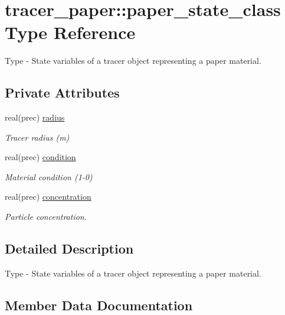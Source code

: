 \hypertarget{structtracer__paper_1_1paper__state__class}{}\section{tracer\+\_\+paper\+:\+:paper\+\_\+state\+\_\+class Type Reference}
\label{structtracer__paper_1_1paper__state__class}


Type -\/ State variables of a tracer object representing a paper material.  


\subsection*{Private Attributes}
\begin{DoxyCompactItemize}
\item 
real(prec) \mbox{\hyperlink{structtracer__paper_1_1paper__state__class_a931d90e457142607c7e1079b99f72298}{radius}}
\begin{DoxyCompactList}\small\item\em Tracer radius (m) \end{DoxyCompactList}\item 
real(prec) \mbox{\hyperlink{structtracer__paper_1_1paper__state__class_a1e2ac1d6419a5ec39dd8529f8cd83112}{condition}}
\begin{DoxyCompactList}\small\item\em Material condition (1-\/0) \end{DoxyCompactList}\item 
real(prec) \mbox{\hyperlink{structtracer__paper_1_1paper__state__class_aa470bc7607345df98b01f08b2450640e}{concentration}}
\begin{DoxyCompactList}\small\item\em Particle concentration. \end{DoxyCompactList}\end{DoxyCompactItemize}


\subsection{Detailed Description}
Type -\/ State variables of a tracer object representing a paper material. 

\subsection{Member Data Documentation}
\mbox{\label{structtracer__paper_1_1paper__state__class_aa470bc7607345df98b01f08b2450640e}} 
